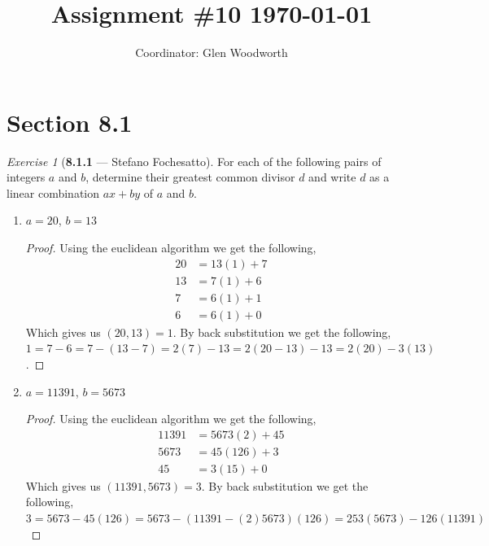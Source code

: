 \documentclass[12pt]{amsart}
\title{Assignment \#10 \today}
\author{Coordinator: Glen Woodworth}
\theoremstyle{remark}
\newtheorem*{exercise}{Exercise}%
\theoremstyle{mycomment}
\begin{document}
\maketitle
\doublespacing %


\section*{Section 8.1}

\begin{exercise}[\textbf{8.1.1} --- Stefano Fochesatto] For each of the following pairs of integers $a$ and $b$, determine their greatest common divisor $d$
  and write $d$ as a linear combination $ax + by$ of $a$ and $b$. 
  \begin{enumerate}
    \item[a.] $a = 20$, $b = 13$ 
    \begin{proof} Using the euclidean algorithm we get the following, 
      \begin{align*}
        20 &= 13(1) + 7\\
        13 &= 7(1) + 6\\
        7 &= 6(1) + 1\\
        6 &= 6(1) + 0
      \end{align*}
      Which gives us $(20, 13) = 1$. By back substitution we get the following, $1 = 7 - 6 = 7 - (13 - 7) = 2(7) - 13 = 2(20 - 13) - 13 = 2(20) - 3(13)$.
    \end{proof}
    \vspace{.15in}


    \item[c.] $a = 11391$, $b = 5673$
    \begin{proof} Using the euclidean algorithm we get the following, 
      \begin{align*}
        11391 &= 5673(2) + 45\\
      5673 &= 45(126) + 3\\
        45 &= 3(15) + 0
      \end{align*}
      Which gives us $(11391, 5673) = 3$. By back substitution we get the following, $3 = 5673 - 45(126) = 5673 - (11391 - (2)5673)(126) = 253(5673) - 126(11391)$
    \end{proof}
    \vspace{.15in}




\end{enumerate}
\end{exercise}
\end{document}

